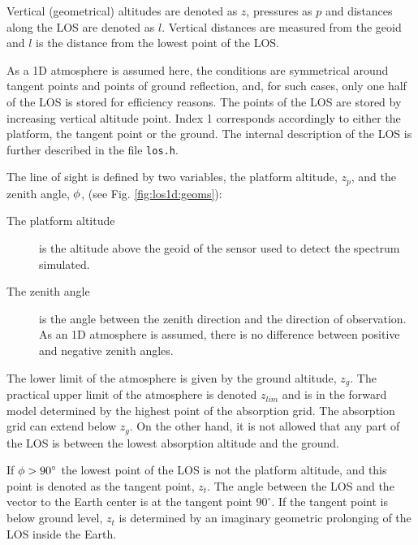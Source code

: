  \label{sec:los:defs}
 
 Vertical (geometrical) altitudes are denoted as $z$, pressures as $p$
 and distances along the LOS are denoted as $l$. Vertical distances
 are measured from the geoid and $l$ is the distance from the lowest
 point of the LOS. 
 
 As a 1D atmosphere is assumed here, the conditions are symmetrical
 around tangent points and points of ground reflection, and, for such
 cases, only one half of the LOS is stored for efficiency reasons.
 The points of the LOS are stored by increasing vertical altitude
 point. Index 1 corresponds accordingly to either the platform, the
 tangent point or the ground.  The internal description of the LOS is
 further described in the file \verb|los.h|.
  
 The line of sight is defined by two variables, the platform altitude,
 $z_p$, and the zenith angle, $\phi$, (see Fig. \ref{fig:los1d:geoms}):

 \begin{description}
  \item[The platform altitude] is the altitude above the geoid of the
       sensor used to detect the spectrum simulated.
  \item[The zenith angle] is the angle between the zenith
       direction and the direction of observation. As an 1D atmosphere is
       assumed, there is no difference between positive and negative
       zenith angles.
  \end{description}

  \noindent
  The lower limit of the atmosphere is given by the ground altitude,
  $z_g$. The practical upper limit of the atmosphere is denoted
  $z_{lim}$ and is in the forward model determined by the highest
  point of the absorption grid. The absorption grid can
  extend below $z_g$. On the other hand, it is not allowed that any
  part of the LOS is between the lowest absorption altitude and the ground.
 
  If $\phi>90^{\circ}$ the lowest point of the LOS is not the platform
  altitude, and this point is denoted as the tangent point, $z_t$. The
  angle between the LOS and the vector to the Earth center is at the
  tangent point $90^\circ$. If the tangent point is below ground
  level, $z_t$ is determined by an imaginary geometric prolonging of
  the LOS inside the Earth.

